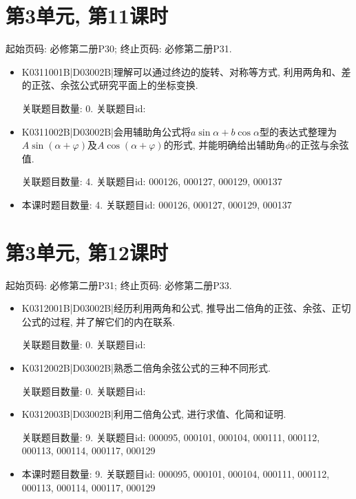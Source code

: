 \section*{第3单元, 第11课时}
起始页码: 必修第二册P30; 终止页码: 必修第二册P31.
\begin{itemize}
\item K0311001B|D03002B|理解可以通过终边的旋转、对称等方式, 利用两角和、差的正弦、余弦公式研究平面上的坐标变换.

关联题目数量: 0. 关联题目id: 

\item K0311002B|D03002B|会用辅助角公式将$a\sin\alpha+b\cos\alpha$型的表达式整理为$A\sin(\alpha+\varphi)$及$A\cos(\alpha+\varphi)$的形式, 并能明确给出辅助角$\phi$的正弦与余弦值.

关联题目数量: 4. 关联题目id: 000126, 000127, 000129, 000137

\item 本课时题目数量: 4. 关联题目id: 000126, 000127, 000129, 000137

\end{itemize}

\section*{第3单元, 第12课时}
起始页码: 必修第二册P31; 终止页码: 必修第二册P33.
\begin{itemize}
\item K0312001B|D03002B|经历利用两角和公式, 推导出二倍角的正弦、余弦、正切公式的过程, 并了解它们的内在联系.

关联题目数量: 0. 关联题目id: 

\item K0312002B|D03002B|熟悉二倍角余弦公式的三种不同形式.

关联题目数量: 0. 关联题目id: 

\item K0312003B|D03002B|利用二倍角公式, 进行求值、化简和证明.

关联题目数量: 9. 关联题目id: 000095, 000101, 000104, 000111, 000112, 000113, 000114, 000117, 000129

\item 本课时题目数量: 9. 关联题目id: 000095, 000101, 000104, 000111, 000112, 000113, 000114, 000117, 000129

\end{itemize}

